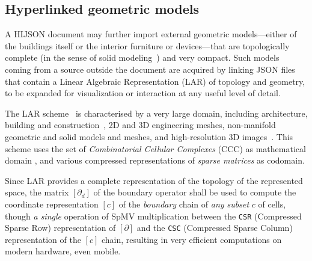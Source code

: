 \subsection{Hyperlinked geometric models}\label{optional-lar}

A HIJSON document may further import external geometric models---either of the buildings itself or the interior furniture or devices---that are topologically complete (in the sense of solid modeling~\cite{Requicha:1980:RRS:356827.356833}) and very compact. 
Such models coming from a source outside the document are acquired by linking JSON files that contain a Linear Algebraic Representation (LAR) of topology and geometry, to be expanded for visualization or interaction at any useful level of detail. 

The LAR scheme~\cite{Dicarlo:2014:TNL:2543138.2543294} is characterised by a very large domain, including architecture, building and construction~\cite{paoluzziMS:2014}, 2D and 3D engineering meshes, non-manifold geometric and solid models and meshes, and high-resolution 3D images~\cite{cadanda:2015}. This scheme uses the set of \emph{Combinatorial Cellular Complexes} (CCC) as mathematical domain
\cite{Basak:2010}, and various compressed representations of \emph{sparse matrices} \cite{gemmexp} as codomain. 

Since LAR provides a complete representation of the topology of the represented space,
the matrix $[\partial_d]$ of the boundary operator shall be used to compute the coordinate representation $[c]$ of the \emph{boundary} chain of \emph{any subset} $c$ of cells, though \emph{a single} operation of SpMV multiplication \cite{gemmexp} between the \texttt{CSR} (Compressed Sparse Row) representation of $[\partial]$ and the \texttt{CSC} (Compressed Sparse Column) representation of the $[c]$ chain, resulting in very efficient computations on modern hardware, even mobile.




